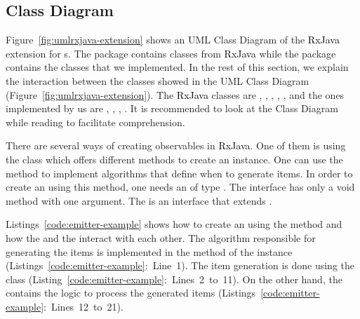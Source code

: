 \documentclass[type=bsc,accentcolor=tud9c]{tudthesis}
\newcommand{\framework}[1]{\textcolor{black}{#1}}
\begin{document}
\subsection{Class Diagram}

Figure~\ref{fig:umlrxjava-extension} shows an UML Class Diagram of the \framework{RxJava} extension for s. The package  contains classes from \framework{RxJava} while the package  contains the classes that we implemented. In the rest of this section, we explain the interaction between the classes showed in the UML Class Diagram (Figure~\ref{fig:umlrxjava-extension}). The \framework{RxJava} classes are , , , , , and the ones implemented by us are , , , . It is recommended to look at the Class Diagram while reading to facilitate comprehension.

There are several ways of creating observables in \framework{RxJava}. One of them is using the class  which offers different methods to create an  instance. One can use the method  to implement algorithms that define when to generate items. In order to create an  using this method, one needs an  of type . The  interface has only a void method with one argument. The  is an interface that extends .



Listings~\ref{code:emitter-example} shows how to create an  using the method  and how the  and the  interact with each other. The algorithm responsible for generating the items is implemented in the  method of the instance  (Listings~\ref{code:emitter-example}:~Line~1). The item generation is done using the class  (Listing~\ref{code:emitter-example}:~Lines~2~to~11). On the other hand, the  contains the logic to process the generated items (Listings~\ref{code:emitter-example}:~Lines~12~to~21).
\end{document}

